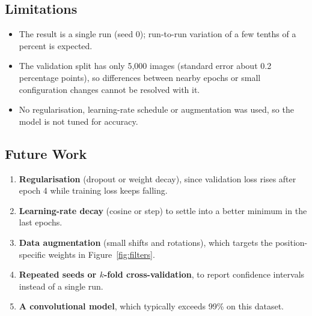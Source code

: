 \documentclass[10pt, a4paper]{article}
\begin{document}
\subsection*{Limitations}

\begin{itemize}
  \item The result is a single run (seed 0); run-to-run variation of a few tenths of a percent is expected.
  \item The validation split has only 5{,}000 images (standard error about 0.2 percentage points), so differences between nearby epochs or small configuration changes cannot be resolved with it.
  \item No regularisation, learning-rate schedule or augmentation was used, so the model is not tuned for accuracy.
\end{itemize}

\subsection*{Future Work}

\begin{enumerate}
  \item \textbf{Regularisation} (dropout or weight decay), since validation loss rises after epoch 4 while training loss keeps falling.
  \item \textbf{Learning-rate decay} (cosine or step) to settle into a better minimum in the last epochs.
  \item \textbf{Data augmentation} (small shifts and rotations), which targets the position-specific weights in Figure~\ref{fig:filters}.
  \item \textbf{Repeated seeds or $k$-fold cross-validation}, to report confidence intervals instead of a single run.
  \item \textbf{A convolutional model}, which typically exceeds 99\% on this dataset.
\end{enumerate}
\end{document}
